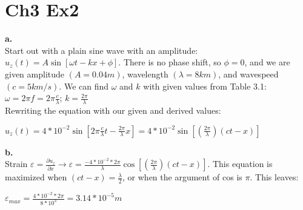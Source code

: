 \documentclass{article}
\begin{document}
\section{Ch3 Ex2}
\textbf{a.}\\
Start out with a plain sine wave with an amplitude: $u_z\left(t\right) = A \sin\left[ \omega t - k x + \phi   \right]$. There is no phase shift, so $\phi = 0$, and we are given amplitude $\left(A = 0.04m\right)$, wavelength $\left(\lambda = 8km\right)$, and wavespeed $\left(c = 5 km/s\right)$. We can find $\omega$ and $k$ with given values from Table 3.1: $\omega = 2\pi f = 2\pi \frac{c}{\lambda}$; $k = \frac{2\pi}{\lambda}$ \\

Rewriting the equation with our given and derived values: \\
\begin{center}
$u_z\left(t\right) = 4*10^{-2} \sin\left[2\pi \frac{c}{\lambda} t - \frac{2\pi}{\lambda}x\right] = 4*10^{-2}  \sin\left[\left(\frac{2\pi}{\lambda}\right)\left(ct-x\right)\right]$ \\
\end{center}

\textbf{b.}\\
Strain $\varepsilon = \frac{\partial{u_z}}{\partial{x}} \rightarrow
\varepsilon = \frac{-4*10^{-2} *2\pi}{\lambda} \cos\left[\left(\frac{2\pi}{\lambda}\right)(ct-x)\right]$. This equation is maximized when $\left(ct-x\right) = \frac{\lambda}{2}$, or when the argument of cos is $\pi$. This leaves:
\begin{center}
$\varepsilon_{max} = \frac{4*10^{-2} *2\pi}{8*10^{3}} = 3.14 * 10^{-5}m$ 
\end{center}
\end{document}
